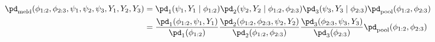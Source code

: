 \begin{align}
  \pd_{\text{meld}} (\phi_{1:2}, \phi_{2:3}, \psi_{1}, \psi_{2}, \psi_{3}, Y_{1}, Y_{2}, Y_{3})  &=   
    \pd_{1} (\psi_{1}, Y_{1} \mid \phi_{1:2})
    \pd_{2} (\psi_{2}, Y_{2} \mid \phi_{1:2}, \phi_{2:3})
    \pd_{3} (\psi_{3}, Y_{3} \mid \phi_{2:3})  
    \pd_{\text{pool}}(\phi_{1:2}, \phi_{2:3})
    \\ &= 
    \frac {
      \pd_{1} (\phi_{1:2}, \psi_{1}, Y_{1})
    } {
      \pd_{1}(\phi_{1:2})
    }
    \frac {
      \pd_{2} (\phi_{1:2}, \phi_{2:3}, \psi_{2}, Y_{2})
    } {
      \pd_{2}(\phi_{1:2}, \phi_{2:3})
    }
    \frac {
      \pd_{3} (\phi_{2:3}, \psi_{3}, Y_{3})
    } {
      \pd_{3}(\phi_{2:3})
    }
    \pd_{\text{pool}}(\phi_{1:2}, \phi_{2:3})
  \label{eqn:melded-model}
\end{align}